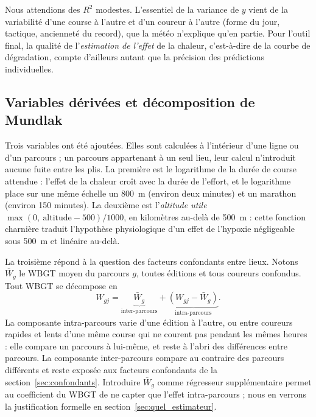 \documentclass[11pt,a4paper]{article}
\begin{document}
Nous attendions des $R^2$ modestes. L'essentiel de la variance de $y$ vient de la variabilité d'une course à l'autre et
d'un coureur à l'autre (forme du jour, tactique, ancienneté du record), que la météo n'explique qu'en partie. Pour
l'outil final, la qualité de l'\emph{estimation de l'effet} de la chaleur, c'est-à-dire de la courbe de dégradation,
compte d'ailleurs autant que la précision des prédictions individuelles.

\subsection{Variables dérivées et décomposition de Mundlak}\label{sec:mundlak}

Trois variables ont été ajoutées. Elles sont calculées à l'intérieur d'une ligne ou d'un parcours ; un parcours
appartenant à un seul lieu, leur calcul n'introduit aucune fuite entre les plis. La première est le logarithme de la
durée de course attendue : l'effet de la chaleur croît avec la durée de l'effort, et le logarithme place sur une même
échelle un 800~m (environ deux minutes) et un marathon (environ 150 minutes). La deuxième est l'\emph{altitude utile}
$\max(0,\ \text{altitude} - 500)/1000$, en kilomètres au-delà de 500~m : cette fonction charnière traduit l'hypothèse
physiologique d'un effet de l'hypoxie négligeable sous 500~m et linéaire au-delà.

La troisième répond à la question des facteurs confondants entre lieux. Notons $\bar W_g$ le WBGT moyen du parcours
$g$, toutes éditions et tous coureurs confondus. Tout WBGT se décompose en
\begin{equation}\label{eq:mundlak}
W_{gj} = \underbrace{\bar W_g}_{\text{inter-parcours}} + \underbrace{(W_{gj} - \bar W_g)}_{\text{intra-parcours}} .
\end{equation}
La composante intra-parcours varie d'une édition à l'autre, ou entre coureurs rapides et lents d'une même course qui ne
courent pas pendant les mêmes heures : elle compare un parcours à lui-même, et reste à l'abri des différences entre
parcours. La composante inter-parcours compare au contraire des parcours différents et reste exposée aux facteurs
confondants de la section~\ref{sec:confondants}. Introduire $\bar W_g$ comme régresseur supplémentaire permet au
coefficient du WBGT de ne capter que l'effet intra-parcours \citep{mundlak1978} ; nous en verrons la justification
formelle en section~\ref{sec:quel_estimateur}.
\end{document}
